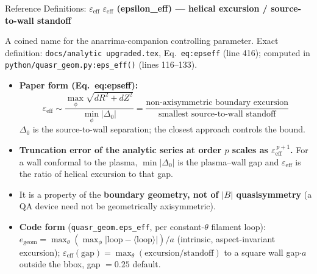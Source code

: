 \documentclass[11pt,aspectratio=169]{beamer}
\newcommand{\qitem}[1]{\medskip\textbf{#1}\par}
\begin{document}
\begin{frame}[allowframebreaks]{Reference Definitions: $\varepsilon_{\mathrm{eff}}$}
\small
\qitem{$\varepsilon_{\mathrm{eff}}$ (epsilon\_eff) --- helical excursion / source-to-wall standoff}
A coined name for the anarrima-companion controlling parameter. Exact definition:
\texttt{docs/analytic upgraded.tex}, Eq.\ \texttt{eq:epseff} (line 416); computed in
\texttt{python/quasr\_geom.py:eps\_eff()} (lines 116--133).
\begin{itemize}
\item \textbf{Paper form (Eq.\ eq:epseff):}
\[
\varepsilon_{\mathrm{eff}} \sim \frac{\max_\phi \sqrt{dR^2 + dZ^2}}{\min_\phi |\Delta_0|}
= \frac{\text{non-axisymmetric boundary excursion}}{\text{smallest source-to-wall standoff}}
\]
$\Delta_0$ is the source-to-wall separation; the closest approach controls the bound.
\item \textbf{Truncation error of the analytic series at order $p$ scales as
      $\varepsilon_{\mathrm{eff}}^{\,p+1}$.} For a wall conformal to the plasma, $\min|\Delta_0|$
      is the plasma--wall gap and $\varepsilon_{\mathrm{eff}}$ is the ratio of helical
      excursion to that gap.
\item It is a property of the \textbf{boundary geometry, not of $|B|$ quasisymmetry} (a QA
      device need not be geometrically axisymmetric).
\item \textbf{Code form} (\texttt{quasr\_geom.eps\_eff}, per constant-$\theta$ filament loop):
      $e_{\text{geom}} = \max_\theta(\max_\phi|\text{loop} - \langle\text{loop}\rangle|)/a$
      (intrinsic, aspect-invariant excursion);
      $\varepsilon_{\mathrm{eff}}(\text{gap}) = \max_\theta(\text{excursion}/\text{standoff})$
      to a square wall gap$\cdot a$ outside the bbox, gap $= 0.25$ default.
\end{itemize}


\end{frame}
\end{document}
